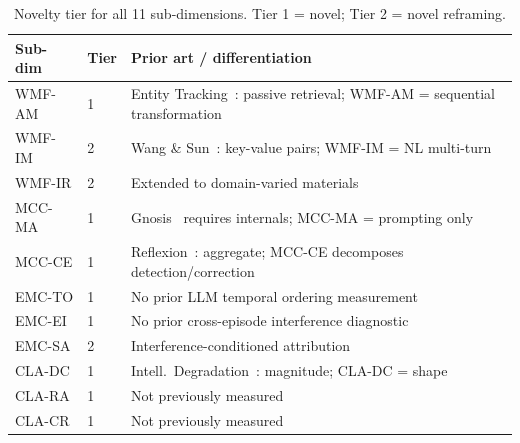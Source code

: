 \documentclass{article}
\begin{document}
\begin{table}[h]
\centering
\small
\caption{Novelty tier for all 11 sub-dimensions. Tier 1 = novel;
Tier 2 = novel reframing.}
\label{tab:novelty}
\begin{tabular}{llp{6.5cm}}
\toprule
\textbf{Sub-dim} & \textbf{Tier} & \textbf{Prior art / differentiation} \\
\midrule
WMF-AM & 1 & Entity Tracking~\citep{entitytracking2023}: passive retrieval; WMF-AM = sequential transformation \\
WMF-IM & 2 & Wang \& Sun~\citep{wang2025unableforgetproactiveinterference}: key-value pairs; WMF-IM = NL multi-turn \\
WMF-IR & 2 & Extended to domain-varied materials \\
MCC-MA & 1 & Gnosis~\citep{ghasemabadi2025can} requires internals; MCC-MA = prompting only \\
MCC-CE & 1 & Reflexion~\citep{shinn2023reflexion}: aggregate; MCC-CE decomposes detection/correction \\
EMC-TO & 1 & No prior LLM temporal ordering measurement \\
EMC-EI & 1 & No prior cross-episode interference diagnostic \\
EMC-SA & 2 & Interference-conditioned attribution \\
CLA-DC & 1 & Intell.\ Degradation~\citep{wang2026intelligence}: magnitude; CLA-DC = shape \\
CLA-RA & 1 & Not previously measured \\
CLA-CR & 1 & Not previously measured \\
\bottomrule
\end{tabular}
\end{table}
\end{document}
